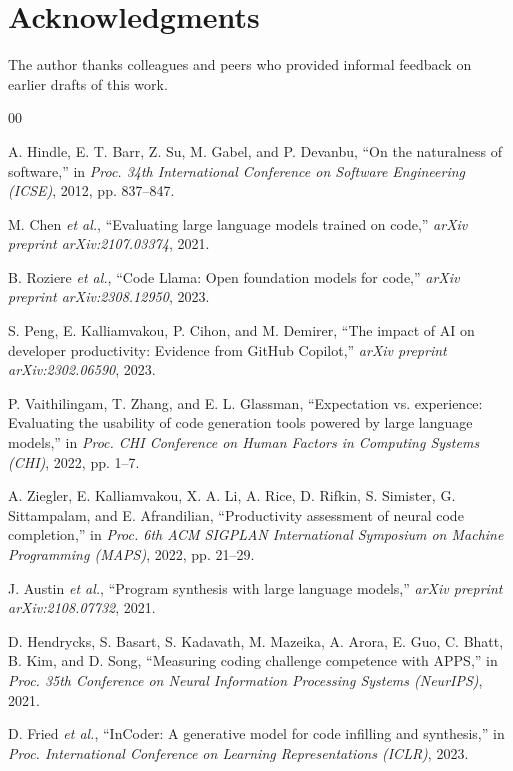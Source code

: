 \documentclass[conference]{IEEEtran}
\begin{document}
\section*{Acknowledgments}

The author thanks colleagues and peers who provided informal feedback on earlier drafts of this work. 

\begin{thebibliography}{00}

A. Hindle, E. T. Barr, Z. Su, M. Gabel, and P. Devanbu, ``On the naturalness of software,'' in \textit{Proc. 34th International Conference on Software Engineering (ICSE)}, 2012, pp. 837--847.

M. Chen \textit{et al.}, ``Evaluating large language models trained on code,'' \textit{arXiv preprint arXiv:2107.03374}, 2021.

B. Roziere \textit{et al.}, ``Code Llama: Open foundation models for code,'' \textit{arXiv preprint arXiv:2308.12950}, 2023.

S. Peng, E. Kalliamvakou, P. Cihon, and M. Demirer, ``The impact of AI on developer productivity: Evidence from GitHub Copilot,'' \textit{arXiv preprint arXiv:2302.06590}, 2023.

P. Vaithilingam, T. Zhang, and E. L. Glassman, ``Expectation vs. experience: Evaluating the usability of code generation tools powered by large language models,'' in \textit{Proc. CHI Conference on Human Factors in Computing Systems (CHI)}, 2022, pp. 1--7.

A. Ziegler, E. Kalliamvakou, X. A. Li, A. Rice, D. Rifkin, S. Simister, G. Sittampalam, and E. Afrandilian, ``Productivity assessment of neural code completion,'' in \textit{Proc. 6th ACM SIGPLAN International Symposium on Machine Programming (MAPS)}, 2022, pp. 21--29.

J. Austin \textit{et al.}, ``Program synthesis with large language models,'' \textit{arXiv preprint arXiv:2108.07732}, 2021.

D. Hendrycks, S. Basart, S. Kadavath, M. Mazeika, A. Arora, E. Guo, C. Bhatt, B. Kim, and D. Song, ``Measuring coding challenge competence with APPS,'' in \textit{Proc. 35th Conference on Neural Information Processing Systems (NeurIPS)}, 2021.

D. Fried \textit{et al.}, ``InCoder: A generative model for code infilling and synthesis,'' in \textit{Proc. International Conference on Learning Representations (ICLR)}, 2023.


\end{thebibliography}
\end{document}
